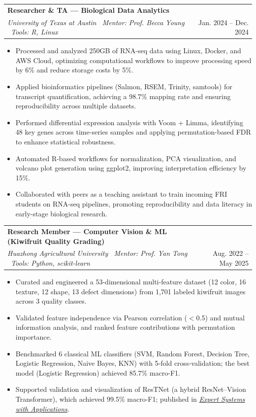\documentclass[letterpaper,11pt]{article}
\makeatletter
\newcommand{\resumeItem}[1]{\item\footnotesize{{#1 \vspace{-5pt}}}}
\newcommand{\resumeSubheading}[4]{
  \vspace{-4.3pt}\item
    \begin{tabular*}{0.97\textwidth}[t]{l@{\extracolsep{\fill}}r}
      \textbf{#1} & \small#2 \\
      \textit{\small#3} & \small#4 \\
    \end{tabular*}\vspace{-8pt}
}
\newcommand{\resumeItemListStart}{\begin{itemize}}
\newcommand{\resumeItemListEnd}{\end{itemize}\vspace{-5pt}}
\makeatother
\begin{document}
        \vspace{4pt}
    \resumeSubheading
      {Researcher \& TA — Biological Data Analytics}{}{University of Texas at Austin \textbar\ Mentor: Prof. Becca Young \textbar\ Tools: R, Linux}{Jan. 2024 – Dec. 2024}
      \resumeItemListStart
        \resumeItem{Processed and analyzed 250GB of RNA-seq data using Linux, Docker, and AWS Cloud, optimizing computational workflows to improve processing speed by 6\% and reduce storage costs by 5\%.}
        \resumeItem{Applied bioinformatics pipelines (Salmon, RSEM, Trinity, samtools) for transcript quantification, achieving a 98.7\% mapping rate and ensuring reproducibility across multiple datasets.}
        \resumeItem{Performed differential expression analysis with Voom + Limma, identifying 48 key genes across time-series samples and applying permutation-based FDR to enhance statistical robustness.}
        \resumeItem{Automated R-based workflows for normalization, PCA visualization, and volcano plot generation using ggplot2, improving interpretation efficiency by 15\%.}
        \resumeItem{Collaborated with peers as a teaching assistant to train incoming FRI students on RNA-seq pipelines, promoting reproducibility and data literacy in early-stage biological research.}
      \resumeItemListEnd

    
    \vspace{4pt}
    \resumeSubheading
      {Research Member — Computer Vision \& ML (Kiwifruit Quality Grading)}{}{Huazhong Agricultural University \textbar\ Mentor: Prof. Yan Tong \textbar\ Tools: Python, scikit-learn}{Aug. 2022 – May 2025}
      \resumeItemListStart
        \resumeItem{Curated and engineered a 53-dimensional multi-feature dataset (12 color, 16 texture, 12 shape, 13 defect dimensions) from 1,701 labeled kiwifruit images across 3 quality classes.}
        \resumeItem{Validated feature independence via Pearson correlation ($<$0.5) and mutual information analysis, and ranked feature contributions with permutation importance.}
        \resumeItem{Benchmarked 6 classical ML classifiers (SVM, Random Forest, Decision Tree, Logistic Regression, Naive Bayes, KNN) with 5-fold cross-validation; the best model (Logistic Regression) achieved 85.7\% macro-F1.}
        \resumeItem{Supported validation and visualization of ResTNet (a hybrid ResNet--Vision Transformer), which achieved 99.5\% macro-F1; published in \href{https://doi.org/10.1016/j.eswa.2025.129507}{\textit{Expert Systems with Applications}}.}
      \resumeItemListEnd
\end{document}
